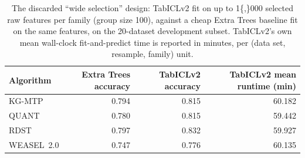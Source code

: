 \begin{table}[t]
\centering
\begin{tabular}{lrrr}
\toprule
Algorithm & Extra Trees accuracy & TabICLv2 accuracy & TabICLv2 mean runtime (min) \\
\midrule
KG-MTP & 0.794 & 0.815 & 60.182 \\
QUANT & 0.780 & 0.815 & 59.442 \\
RDST & 0.797 & 0.832 & 59.927 \\
WEASEL 2.0 & 0.747 & 0.776 & 60.135 \\
\bottomrule
\end{tabular}
\caption{The discarded ``wide selection'' design: TabICLv2 fit on up to 1\{,\}000 selected raw features per family (group size 100), against a cheap Extra Trees baseline fit on the same features, on the 20-dataset development subset. TabICLv2's own mean wall-clock fit-and-predict time is reported in minutes, per (data set, resample, family) unit.}
\label{tab:discarded-design-wide-selection}
\end{table}